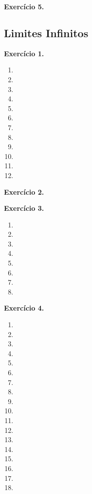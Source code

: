 \documentclass[12pt,a4paper]{article}
\begin{document}
\vspace{0.5cm}
\noindent\textbf{Exercício 5.}

\subsection{Limites Infinitos}
\vspace{0.5cm}
\noindent\textbf{Exercício 1.}
\begin{enumerate}
    \renewcommand{\theenumi}{\alph{enumi}}
    \renewcommand{\labelenumi}{\theenumi)}
    \item 
    \item 
    \item 
    \item 
    \item 
    \item 
    \item 
    \item 
    \item 
    \item 
    \item 
    \item 
\end{enumerate}

\vspace{0.5cm}
\noindent\textbf{Exercício 2.}

\vspace{0.5cm}
\noindent\textbf{Exercício 3.}
\begin{enumerate}
    \renewcommand{\theenumi}{\alph{enumi}}
    \renewcommand{\labelenumi}{\theenumi)}
    \item 
    \item 
    \item 
    \item 
    \item 
    \item 
    \item 
    \item 
\end{enumerate}

\vspace{0.5cm}
\noindent\textbf{Exercício 4.}
\begin{enumerate}
    \renewcommand{\theenumi}{\alph{enumi}}
    \renewcommand{\labelenumi}{\theenumi)}
    \item 
    \item 
    \item 
    \item 
    \item 
    \item 
    \item 
    \item 
    \item 
    \item 
    \item 
    \item 
    \item 
    \item 
    \item 
    \item 
    \item 
    \item 
\end{enumerate}
\end{document}
